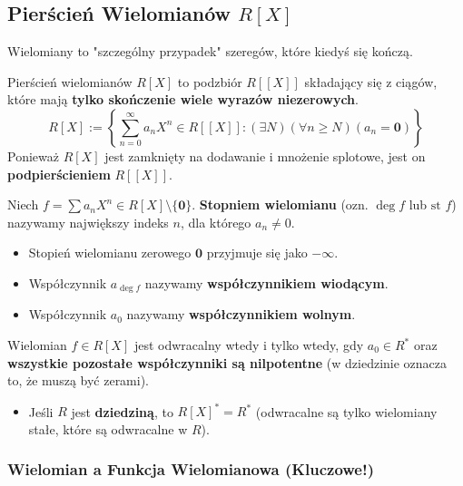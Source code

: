 \subsection*{Pierścień Wielomianów $R[X]$}

Wielomiany to "szczególny przypadek" szeregów, które kiedyś się kończą.

\begin{definition}[Wielomian]
    Pierścień wielomianów $R[X]$ to podzbiór $R[[X]]$ składający się z ciągów, które mają \textbf{tylko skończenie wiele wyrazów niezerowych}.
    \[ R[X] := \left\{ \sum_{n=0}^\infty a_n X^n \in R[[X]] : (\exists N)(\forall n \ge N)(a_n = \mathbf{0}) \right\} \]
    Ponieważ $R[X]$ jest zamknięty na dodawanie i mnożenie splotowe, jest on \textbf{podpierścieniem} $R[[X]]$.
\end{definition}

\begin{definition}
    Niech $f = \sum a_n X^n \in R[X] \setminus \{\mathbf{0}\}$.
    \textbf{Stopniem wielomianu} (ozn. $\deg f$ lub $\text{st } f$) nazywamy największy indeks $n$, dla którego $a_n \neq 0$.
    \begin{itemize}
        \item Stopień wielomianu zerowego $\mathbf{0}$ przyjmuje się jako $-\infty$.
        \item Współczynnik $a_{\deg f}$ nazywamy \textbf{współczynnikiem wiodącym}.
	\item Współczynnik $a_0$ nazywamy \textbf{współczynnikiem wolnym}. 
    \end{itemize}
\end{definition}

\begin{fact}
    Wielomian $f \in R[X]$ jest odwracalny wtedy i tylko wtedy, gdy $a_0 \in R^*$ oraz \textbf{wszystkie pozostałe współczynniki są nilpotentne} (w dziedzinie oznacza to, że muszą być zerami).
    \begin{itemize}
        \item Jeśli $R$ jest \textbf{dziedziną}, to $R[X]^* = R^*$ (odwracalne są tylko wielomiany stałe, które są odwracalne w $R$).
    \end{itemize}
\end{fact}

\subsubsection*{Wielomian a Funkcja Wielomianowa (Kluczowe!)}

